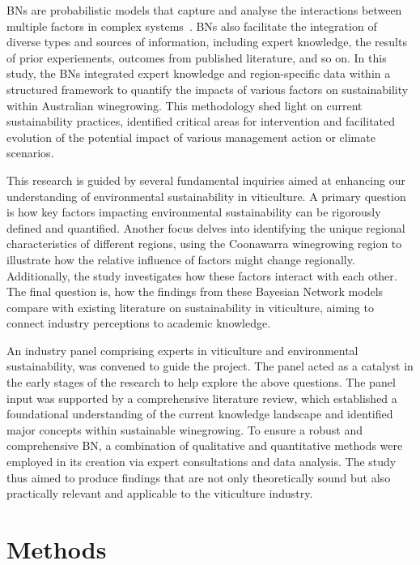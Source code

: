 BNs are probabilistic models that capture and analyse the interactions between multiple factors in complex systems~\cite{korbBayesianArtificialIntelligence2011}. BNs also facilitate the integration of diverse types and sources of information, including expert knowledge, the results of prior experiements, outcomes from published literature, and so on. In this study, the BNs integrated expert knowledge and region-specific data within a structured framework to quantify the impacts of various factors on sustainability within Australian winegrowing. This methodology shed light on current sustainability practices, identified critical areas for intervention and facilitated evolution of the potential impact of various management action or climate scenarios.

This research is guided by several fundamental inquiries aimed at enhancing our understanding of environmental sustainability in viticulture. A primary question is how key factors impacting environmental sustainability can be rigorously defined and quantified. Another focus delves into identifying the unique regional characteristics of different regions, using the Coonawarra winegrowing region to illustrate how the relative influence of factors might change regionally. Additionally, the study investigates how these factors interact with each other. The final question is, how the findings from these Bayesian Network models compare with existing literature on sustainability in viticulture, aiming to connect industry perceptions to academic knowledge.

An industry panel comprising experts in viticulture and environmental sustainability, was convened to guide the project. The panel acted as a catalyst in the early stages of the research to help explore the above questions. The panel input was supported by a comprehensive literature review, which established a foundational understanding of the current knowledge landscape and identified major concepts within sustainable winegrowing. To ensure a robust and comprehensive BN, a combination of qualitative and quantitative methods were employed in its creation via expert consultations and data analysis. The study thus aimed to produce findings that are not only theoretically sound but also practically relevant and applicable to the viticulture industry.

\section{Methods}

